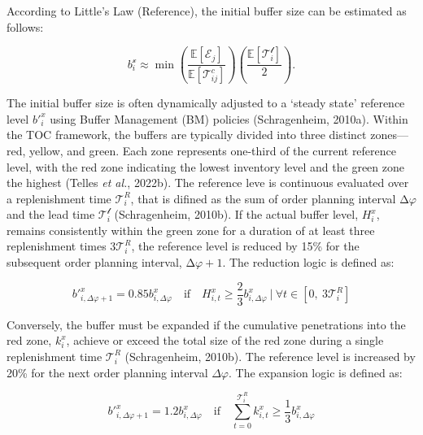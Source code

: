 According to Little's Law (\colorbox{yellow!40}{Reference}), the initial buffer size can
be estimated as follows:

\begin{equation}
b_{i}^{\mathcal{x}} \approx \min\left( \frac{\mathbb{E}\left\lbrack \mathcal{E}_{j} \right\rbrack}{\mathbb{E}\left\lbrack \mathcal{T}_{ij}^{c} \right\rbrack} \right)\left( \frac{\mathbb{E}\left\lbrack \mathcal{T}_{i}^{\mathcal{l}} \right\rbrack}{2} \right).
\tag{12}
\end{equation}

The initial buffer size is often dynamically adjusted to a `steady
state' reference level \({b'}_{i}^{x}\) using Buffer Management (BM)
policies (Schragenheim, 2010a). Within the TOC framework, the buffers
are typically divided into three distinct zones---red, yellow, and
green. Each zone represents one-third of the current reference level,
with the red zone indicating the lowest inventory level and the green
zone the highest (Telles \emph{et al.}, 2022b). The reference leve is
continuous evaluated over a replenishment time \(\mathcal{T}_{i}^{R}\),
that is difined as the sum of order planning interval
\(\mathrm{\Delta}\varphi\) and the lead time
\(\mathcal{T}_{i}^{\mathcal{l}}\) (Schragenheim, 2010b). If the actual
buffer level, \(H_{i}^{x}\), remains consistently within the green zone
for a duration of at least three replenishment times
\(3\mathcal{T}_{i}^{R}\), the reference level is reduced by 15\% for the
subsequent order planning interval, \(\mathrm{\Delta}\varphi + 1\). The
reduction logic is defined as:

\begin{equation}
{b'}_{i,\Delta\varphi + 1}^{x} = 0.85b_{i,\Delta\varphi}^{x}\quad\text{if}\quad H_{i,t}^{x} \geq \frac{2}{3}b_{i,\Delta\varphi}^{x}\ |\ \forall t \in \left\lbrack 0,\ 3\mathcal{T}_{i}^{R} \right\rbrack
\tag{13}
\end{equation}

Conversely, the buffer must be expanded if the cumulative penetrations
into the red zone, \(k_{i}^{x}\), achieve or exceed the total size of
the red zone during a single replenishment time \(\mathcal{T}_{i}^{R}\)
(Schragenheim, 2010b). The reference level is increased by 20\% for the
next order planning interval \(\Delta\varphi\). The expansion logic is
defined as:

\begin{equation}
{b'}_{i,\Delta\varphi + 1}^{x} = 1.2b_{i,\Delta\varphi}^{x}\quad\text{if}\quad\sum_{t = 0}^{\mathcal{T}_{i}^{R}}k_{i,t}^{x} \geq \frac{1}{3}b_{i,\Delta\varphi}^{x}
\tag{14}
\end{equation}

